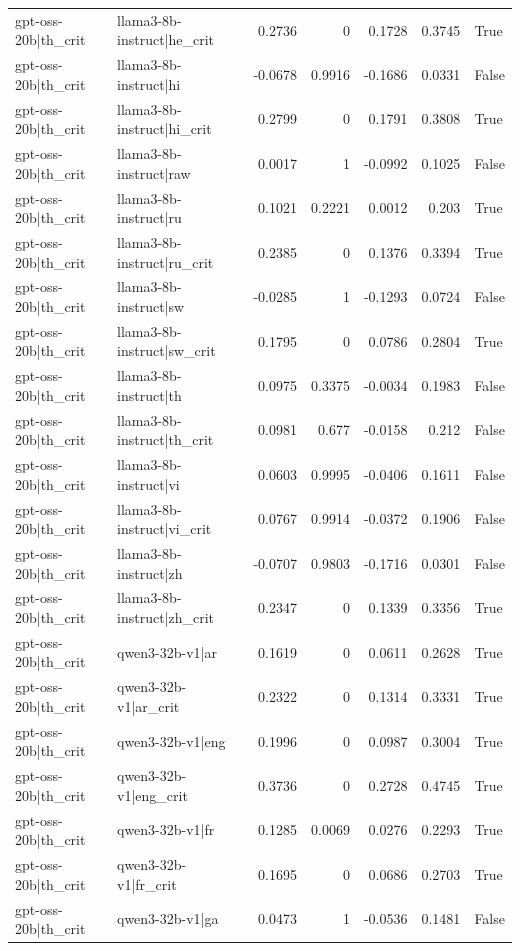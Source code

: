 \begin{table}
\begin{tabular}{l l r r r r l}
gpt-oss-20b|th_crit & llama3-8b-instruct|he_crit & 0.2736 & 0 & 0.1728 & 0.3745 & True \\
gpt-oss-20b|th_crit & llama3-8b-instruct|hi & -0.0678 & 0.9916 & -0.1686 & 0.0331 & False \\
gpt-oss-20b|th_crit & llama3-8b-instruct|hi_crit & 0.2799 & 0 & 0.1791 & 0.3808 & True \\
gpt-oss-20b|th_crit & llama3-8b-instruct|raw & 0.0017 & 1 & -0.0992 & 0.1025 & False \\
gpt-oss-20b|th_crit & llama3-8b-instruct|ru & 0.1021 & 0.2221 & 0.0012 & 0.203 & True \\
gpt-oss-20b|th_crit & llama3-8b-instruct|ru_crit & 0.2385 & 0 & 0.1376 & 0.3394 & True \\
gpt-oss-20b|th_crit & llama3-8b-instruct|sw & -0.0285 & 1 & -0.1293 & 0.0724 & False \\
gpt-oss-20b|th_crit & llama3-8b-instruct|sw_crit & 0.1795 & 0 & 0.0786 & 0.2804 & True \\
gpt-oss-20b|th_crit & llama3-8b-instruct|th & 0.0975 & 0.3375 & -0.0034 & 0.1983 & False \\
gpt-oss-20b|th_crit & llama3-8b-instruct|th_crit & 0.0981 & 0.677 & -0.0158 & 0.212 & False \\
gpt-oss-20b|th_crit & llama3-8b-instruct|vi & 0.0603 & 0.9995 & -0.0406 & 0.1611 & False \\
gpt-oss-20b|th_crit & llama3-8b-instruct|vi_crit & 0.0767 & 0.9914 & -0.0372 & 0.1906 & False \\
gpt-oss-20b|th_crit & llama3-8b-instruct|zh & -0.0707 & 0.9803 & -0.1716 & 0.0301 & False \\
gpt-oss-20b|th_crit & llama3-8b-instruct|zh_crit & 0.2347 & 0 & 0.1339 & 0.3356 & True \\
gpt-oss-20b|th_crit & qwen3-32b-v1|ar & 0.1619 & 0 & 0.0611 & 0.2628 & True \\
gpt-oss-20b|th_crit & qwen3-32b-v1|ar_crit & 0.2322 & 0 & 0.1314 & 0.3331 & True \\
gpt-oss-20b|th_crit & qwen3-32b-v1|eng & 0.1996 & 0 & 0.0987 & 0.3004 & True \\
gpt-oss-20b|th_crit & qwen3-32b-v1|eng_crit & 0.3736 & 0 & 0.2728 & 0.4745 & True \\
gpt-oss-20b|th_crit & qwen3-32b-v1|fr & 0.1285 & 0.0069 & 0.0276 & 0.2293 & True \\
gpt-oss-20b|th_crit & qwen3-32b-v1|fr_crit & 0.1695 & 0 & 0.0686 & 0.2703 & True \\
gpt-oss-20b|th_crit & qwen3-32b-v1|ga & 0.0473 & 1 & -0.0536 & 0.1481 & False \\

\end{tabular}
\end{table}
